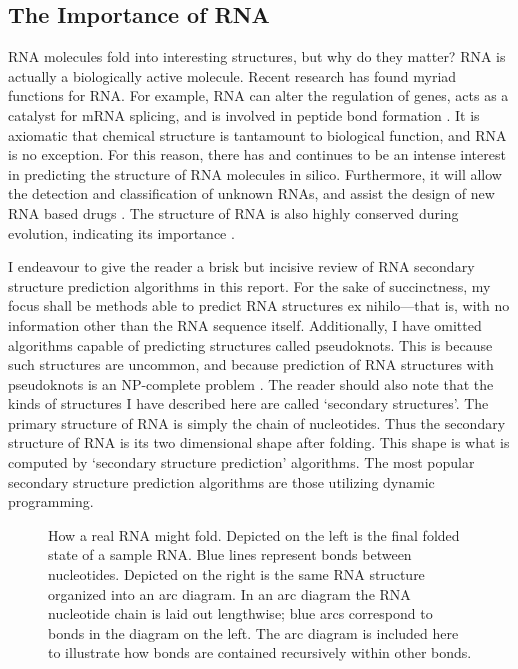 \documentclass[12pt, a4paper]{article}
\begin{document}
\subsection{The Importance of RNA}

RNA molecules fold into interesting structures, but why do they matter? RNA is actually a biologically active molecule. Recent research has found myriad functions for RNA. For example, RNA can alter the regulation of genes, acts as a catalyst for mRNA splicing, and is involved in peptide bond formation
\cite{xu2012statistical}. It is axiomatic that chemical structure is tantamount to biological function, and RNA is no exception. For this reason, there has and continues to be an intense
interest in predicting the structure of RNA
molecules in silico. Furthermore, it will allow the detection and classification of unknown RNAs, and assist the design of new RNA based drugs \cite{condon2003problems}. The structure of RNA
is also highly conserved during evolution, indicating its importance \cite{hofacker2008rna}.

I endeavour to give the reader a brisk but incisive review of RNA secondary structure prediction algorithms in this report. For the sake of succinctness, my focus shall be methods able to predict RNA structures ex nihilo---that is, with no information other than the RNA sequence itself. Additionally, I have omitted algorithms capable of predicting structures called pseudoknots. This is because such structures are uncommon, and because prediction of RNA structures with pseudoknots is an NP-complete problem \cite{lyngso2000rna}. The reader should also note that the kinds of structures I have described here are called `secondary structures'. The primary structure of RNA is simply the chain of nucleotides. Thus the secondary structure of RNA is its two dimensional shape after folding. This shape is what is computed by `secondary structure prediction' algorithms. The most popular secondary structure prediction algorithms are those utilizing dynamic programming.

\begin{figure}
\begin{center}
\end{center}
\caption{How a real RNA might fold. Depicted on the left is the final folded state of a sample RNA. Blue lines represent bonds between nucleotides. Depicted on the right is the same RNA structure organized into an arc diagram. In an arc diagram the RNA nucleotide chain is laid out lengthwise; blue arcs correspond to bonds in the diagram on the left. The arc diagram is included here to illustrate how bonds are contained recursively within other bonds.}
\label{fig:RNAss}
\end{figure}
\end{document}

